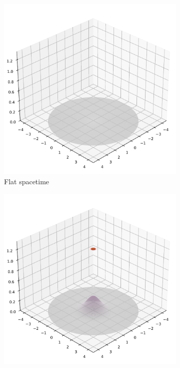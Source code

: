 \documentclass[12pt]{article}
\begin{document}
\begin{figure}[H]
  \centering
  \begin{subfigure}[b]{0.3\textwidth}
    \includegraphics[width=\textwidth]{flat_spacetime.pdf}
    \caption{Flat spacetime}
  \end{subfigure}
  \hfill
  \begin{subfigure}[b]{0.3\textwidth}
    \includegraphics[width=\textwidth]{warp_begins.pdf}

\end{subfigure}
\end{figure}
\end{document}
